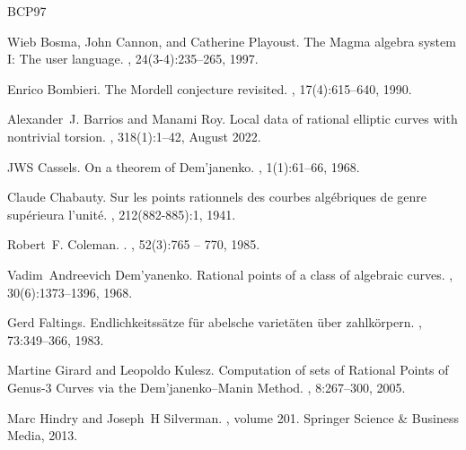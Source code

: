 \documentclass{article}
\theoremstyle{definition}
\begin{document}
\clearpage

% 
\begin{thebibliography}{BCP97}

Wieb Bosma, John Cannon, and Catherine Playoust.
\newblock The {M}agma algebra system I: The user language.
, 24(3-4):235--265, 1997.

Enrico Bombieri.
\newblock The {M}ordell conjecture revisited.
, 17(4):615--640, 1990.

Alexander~J. Barrios and Manami Roy.
\newblock Local data of rational elliptic curves with nontrivial torsion.
, 318(1):1–42, August 2022.

JWS Cassels.
\newblock On a theorem of {D}em'janenko.
, 1(1):61--66, 1968.

Claude Chabauty.
\newblock Sur les points rationnels des courbes alg{\'e}briques de genre sup{\'e}rieura l’unit{\'e}.
, 212(882-885):1, 1941.

Robert~F. Coleman.
.
, 52(3):765 -- 770, 1985.

Vadim~Andreevich Dem'yanenko.
\newblock Rational points of a class of algebraic curves.
, 30(6):1373--1396, 1968.

Gerd Faltings.
\newblock Endlichkeitss{\"a}tze f{\"u}r abelsche variet{\"a}ten {\"u}ber zahlk{\"o}rpern.
, 73:349--366, 1983.

Martine Girard and Leopoldo Kulesz.
\newblock Computation of sets of {R}ational {P}oints of {G}enus-3 {C}urves via the {D}em'janenko--{M}anin {M}ethod.
, 8:267--300, 2005.

Marc Hindry and Joseph~H Silverman.
, volume 201.
\newblock Springer Science \& Business Media, 2013.


\end{thebibliography}
\end{document}
